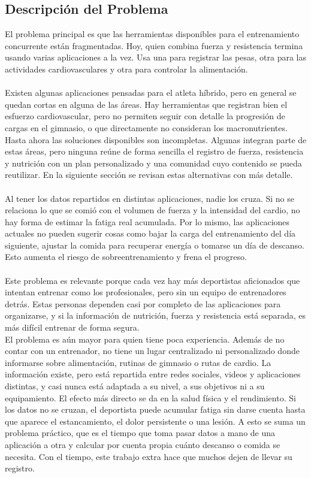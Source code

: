 \subsection{Descripción del Problema}
El problema principal es que las herramientas disponibles para el entrenamiento concurrente están fragmentadas. Hoy, quien combina fuerza y resistencia termina usando varias aplicaciones a la vez. Usa una para registrar las pesas, otra para las actividades cardiovasculares y otra para controlar la alimentación.
\\\\
Existen algunas aplicaciones pensadas para el atleta híbrido, pero en general se quedan cortas en alguna de las áreas. Hay herramientas que registran bien el esfuerzo cardiovascular, pero no permiten seguir con detalle la progresión de cargas en el gimnasio, o que directamente no consideran los macronutrientes. Hasta ahora las soluciones disponibles son incompletas. Algunas integran parte de estas áreas, pero ninguna reúne de forma sencilla el registro de fuerza, resistencia y nutrición con un plan personalizado y una comunidad cuyo contenido se pueda reutilizar. En la siguiente sección se revisan estas alternativas con más detalle.
\\\\
Al tener los datos repartidos en distintas aplicaciones, nadie los cruza. Si no se relaciona lo que se comió con el volumen de fuerza y la intensidad del cardio, no hay forma de estimar la fatiga real acumulada. Por lo mismo, las aplicaciones actuales no pueden sugerir cosas como bajar la carga del entrenamiento del día siguiente, ajustar la comida para recuperar energía o tomarse un día de descanso. Esto aumenta el riesgo de sobreentrenamiento y frena el progreso.
\\\\
Este problema es relevante porque cada vez hay más deportistas aficionados que intentan entrenar como los profesionales, pero sin un equipo de entrenadores detrás. Estas personas dependen casi por completo de las aplicaciones para organizarse, y si la información de nutrición, fuerza y resistencia está separada, es más difícil entrenar de forma segura.
\\
El problema es aún mayor para quien tiene poca experiencia. Además de no contar con un entrenador, no tiene un lugar centralizado ni personalizado donde informarse sobre alimentación, rutinas de gimnasio o rutas de cardio. La información existe, pero está repartida entre redes sociales, videos y aplicaciones distintas, y casi nunca está adaptada a su nivel, a sus objetivos ni a su equipamiento.
El efecto más directo se da en la salud física y el rendimiento. Si los datos no se cruzan, el deportista puede acumular fatiga sin darse cuenta hasta que aparece el estancamiento, el dolor persistente o una lesión. A esto se suma un problema práctico, que es el tiempo que toma pasar datos a mano de una aplicación a otra y calcular por cuenta propia cuánto descanso o comida se necesita. Con el tiempo, este trabajo extra hace que muchos dejen de llevar su registro.
